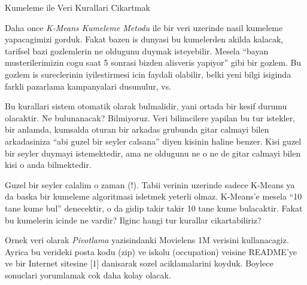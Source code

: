 \documentclass[12pt,fleqn]{article}\usepackage{../common}
\begin{document}
Kumeleme ile Veri Kurallari Cikartmak

Daha once {\em K-Means Kumeleme Metodu} ile bir veri uzerinde nasil
kumeleme yapacagimizi gorduk. Fakat bazen is dunyasi bu kumelerden akilda
kalacak, tarifsel bazi gozlemlerin ne oldugunu duymak isteyebilir. Mesela
``bayan musterilerimizin cogu saat 5 sonrasi bizden alisveris yapiyor''
gibi bir gozlem. Bu gozlem is sureclerinin iyilestirmesi icin faydali
olabilir, belki yeni bilgi isiginda farkli pazarlama kampanyalari
dusunulur, vs. 

Bu kurallari sistem otomatik olarak bulmalidir, yani ortada bir kesif
durumu olacaktir. Ne bulunanacak? Bilmiyoruz. Veri bilimcilere yapilan bu
tur istekler, bir anlamda, kumsalda oturan bir arkadas grubunda gitar
calmayi bilen arkadasiniza ``abi guzel bir seyler calsana'' diyen kisinin
haline benzer. Kisi guzel bir seyler duymayi istemektedir, ama ne oldugunu
ne o ne de gitar calmayi bilen kisi o anda bilmektedir.

Guzel bir seyler calalim o zaman (!). Tabii verinin uzerinde sadece K-Means
ya da baska bir kumeleme algoritmasi isletmek yeterli olmaz. K-Means'e
mesela ``10 tane kume bul'' denecektir, o da gidip takir takir 10 tane kume
bulacaktir. Fakat bu kumelerin icinde ne vardir? Ilginc hangi tur kurallar
cikartabiliriz? 

Ornek veri olarak {\em Pivotlama} yazisindanki Movielens 1M verisini
kullanacagiz. Ayrica bu verideki posta kodu (zip) ve iskolu (occupation)
veisine README'ye ve bir Internet sitesine [1] danisarak sozel
aciklamalarini koyduk. Boylece sonuclari yorumlamak cok daha kolay olacak. 
\end{document}
